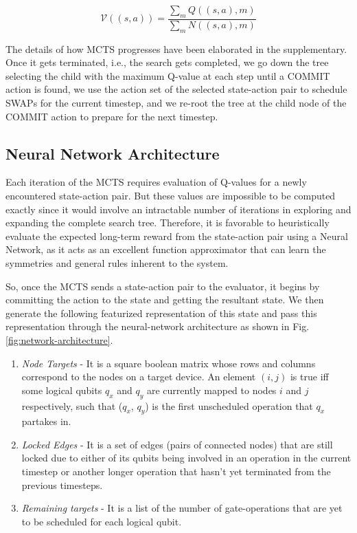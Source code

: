 \begin{equation}\label{eq:train_nn}
    \mathcal{V}((s,a)) = \frac{\sum_{m} Q((s,a), m)}{\sum_{m} N((s,a), m)}
\end{equation}



The details of how MCTS progresses have been elaborated in the supplementary. Once it gets terminated, i.e., the search gets completed, we go down the tree selecting the child with the maximum Q-value at each step until a COMMIT action is found, we use the action set of the selected state-action pair to schedule SWAPs for the current timestep, and we re-root the tree at the child node of the COMMIT action to prepare for the next timestep.

\subsection{\label{sec:method-model}Neural Network Architecture}

Each iteration of the MCTS requires evaluation of Q-values for a newly encountered state-action pair. But these values are impossible to be computed exactly since it would involve an intractable number of iterations in exploring and expanding the complete search tree. Therefore, it is favorable to heuristically evaluate the expected long-term reward from the state-action pair using a Neural Network, as it acts as an excellent function approximator that can learn the symmetries and general rules inherent to the system.

So, once the MCTS sends a state-action pair to the evaluator, it begins by committing the action to the state and getting the resultant state. We then generate the following featurized representation of this state and pass this representation through the neural-network architecture as shown in Fig. \ref{fig:network-architecture}.

\begin{enumerate}
    \item \textit{Node Targets} - It is a square boolean matrix whose rows and columns correspond to the nodes on a target device. An element $(i, j)$ is true iff some logical qubits $q_x$ and $q_y$ are currently mapped to nodes $i$ and $j$ respectively, such that ($q_x$, $q_y$) is the first unscheduled operation that $q_x$ partakes in.
    \item \textit{Locked Edges} - It is a set of edges (pairs of connected nodes) that are still locked due to either of its qubits being involved in an operation in the current timestep or another longer operation that hasn't yet terminated from the previous timesteps.
    \item \textit{Remaining targets} - It is a list of the number of gate-operations that are yet to be scheduled for each logical qubit. 
\end{enumerate}

